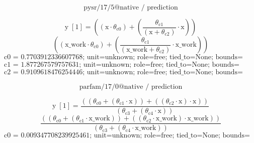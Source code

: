 \[\text{pysr/17/5@native / prediction}\]
\noindent {}\par
\[\text{y}\;[\text{1}] = \left(\left(\text{x} \cdot \theta_{\text{c0}}\right) + \left(\frac{\theta_{\text{c1}}}{\left(\text{x} + \theta_{\text{c2}}\right)} \cdot \text{x}\right)\right)\]
\[\left(\left(\text{x\_work} \cdot \theta_{\text{c0}}\right) + \left(\frac{\theta_{\text{c1}}}{\left(\text{x\_work} + \theta_{\text{c2}}\right)} \cdot \text{x\_work}\right)\right)\]
\[\text{c0 = 0.7703912336607768; unit=unknown; role=free; tied\_to=None; bounds=[None, None]; origin=pysr\_native\_constant\_node}\]
\[\text{c1 = 1.877267579757631; unit=unknown; role=free; tied\_to=None; bounds=[None, None]; origin=pysr\_native\_constant\_node}\]
\[\text{c2 = 0.9109618476254446; unit=unknown; role=free; tied\_to=None; bounds=[None, None]; origin=pysr\_native\_constant\_node}\]
\noindent {}\par
\noindent {}\par
\noindent {}\par
\noindent {}\par
\[\text{parfam/17/0@native / prediction}\]
\noindent {}\par
\[\text{y}\;[\text{1}] = \frac{\left(\left(\theta_{\text{c0}} + \left(\theta_{\text{c1}} \cdot \text{x}\right)\right) + \left(\left(\theta_{\text{c2}} \cdot \text{x}\right) \cdot \text{x}\right)\right)}{\left(\theta_{\text{c3}} + \left(\theta_{\text{c4}} \cdot \text{x}\right)\right)}\]
\[\frac{\left(\left(\theta_{\text{c0}} + \left(\theta_{\text{c1}} \cdot \text{x\_work}\right)\right) + \left(\left(\theta_{\text{c2}} \cdot \text{x\_work}\right) \cdot \text{x\_work}\right)\right)}{\left(\theta_{\text{c3}} + \left(\theta_{\text{c4}} \cdot \text{x\_work}\right)\right)}\]
\[\text{c0 = 0.009347708239925461; unit=unknown; role=free; tied\_to=None; bounds=[None, None]; origin=native\_coefficient\_block}\]
